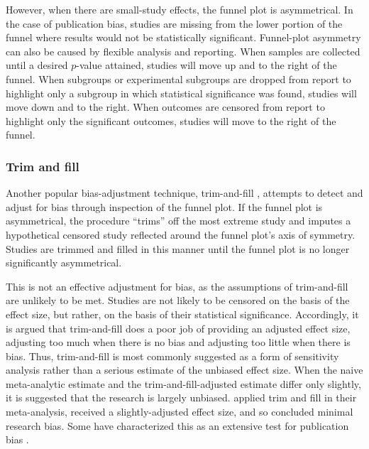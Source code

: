 \documentclass[man]{apa6}
\begin{document}
However, when there are small-study effects, the funnel plot is asymmetrical. In the case of publication bias, studies are missing from the lower portion of the funnel where results would not be statistically significant. Funnel-plot asymmetry can also be caused by flexible analysis and reporting. When samples are collected until a desired $p$-value attained, studies will move up and to the right of the funnel. When subgroups or experimental subgroups are dropped from report to highlight only a subgroup in which statistical significance was found, studies will move down and to the right. When outcomes are censored from report to highlight only the significant outcomes, studies will move to the right of the funnel.

\subsubsection{Trim and fill}
Another popular bias-adjustment technique, trim-and-fill \citep{Duval:Tweedie:2000}, attempts to detect and adjust for bias through inspection of the funnel plot. If the funnel plot is asymmetrical, the procedure ``trims'' off the most extreme study and imputes a hypothetical censored study reflected around the funnel plot's axis of symmetry. Studies are trimmed and filled in this manner until the funnel plot is no longer significantly asymmetrical. 

This is not an effective adjustment for bias, as the assumptions of trim-and-fill are unlikely to be met. Studies are not likely to be censored on the basis of the effect size, but rather, on the basis of their statistical significance. Accordingly, it is argued that trim-and-fill does a poor job of providing an adjusted effect size, adjusting too much when there is no bias and adjusting too little when there is bias. %
Thus, trim-and-fill is most commonly suggested as a form of sensitivity analysis rather than a serious estimate of the unbiased effect size. When the naive meta-analytic estimate and the trim-and-fill-adjusted estimate differ only slightly, it is suggested that the research is largely unbiased.
\citet{Anderson:etal:2014} applied trim and fill in their meta-analysis, received a slightly-adjusted effect size, and so concluded minimal research bias.  %
Some have characterized this as an extensive test for publication bias \citep{some-chucklehead}.  %
\end{document}
